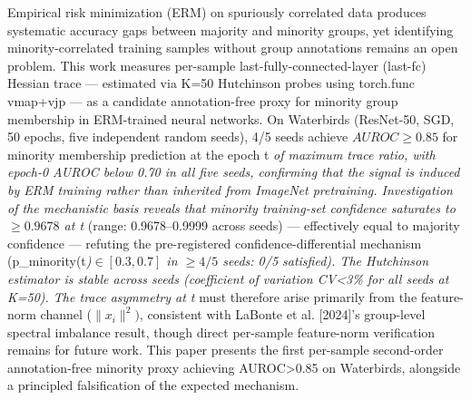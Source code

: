 
Empirical risk minimization (ERM) on spuriously correlated data produces systematic accuracy gaps between majority and minority groups, yet identifying minority-correlated training samples without group annotations remains an open problem. This work measures per-sample last-fully-connected-layer (last-fc) Hessian trace --- estimated via K=50 Hutchinson probes using torch.func vmap+vjp --- as a candidate annotation-free proxy for minority group membership in ERM-trained neural networks. On Waterbirds (ResNet-50, SGD, 50 epochs, five independent random seeds), 4/5 seeds achieve $AUROC\geq 0.85$ for minority membership prediction at the epoch t\textit{ of maximum trace ratio, with epoch-0 AUROC below 0.70 in all five seeds, confirming that the signal is induced by ERM training rather than inherited from ImageNet pretraining. Investigation of the mechanistic basis reveals that minority training-set confidence saturates to $\geq 0.9678$ at t} (range: 0.9678--0.9999 across seeds) --- effectively equal to majority confidence --- refuting the pre-registered confidence-differential mechanism (p\_minority(t\textit{)$\in [0.3,0.7]$ in $\geq 4/5$ seeds: 0/5 satisfied). The Hutchinson estimator is stable across seeds (coefficient of variation CV<3\% for all seeds at K=50). The trace asymmetry at t} must therefore arise primarily from the feature-norm channel ($\|x_{i}\|^{2})$, consistent with LaBonte et al. [2024]'s group-level spectral imbalance result, though direct per-sample feature-norm verification remains for future work. This paper presents the first per-sample second-order annotation-free minority proxy achieving AUROC>0.85 on Waterbirds, alongside a principled falsification of the expected mechanism.
